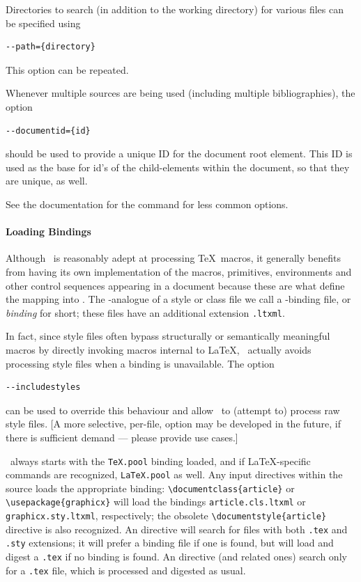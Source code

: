 \documentclass{book}
\begin{document}
Directories to search (in addition to the working directory)
for various files can be specified using
\begin{lstlisting}[style=shell]
--path={directory}
\end{lstlisting}
This option can be repeated.

Whenever multiple sources are being used (including multiple bibliographies),
the option
\begin{lstlisting}[style=shell]
--documentid={id}
\end{lstlisting}
should be used to provide a unique ID for the document root element.
This ID is used as the base for id's of the child-elements within the document,
so that they are unique, as well.

See the documentation for the command  for
less common options.

\paragraph{Loading Bindings}\label{usage.conversion.loading}
Although \LaTeXML\ is reasonably adept at processing \TeX\ macros,
it generally benefits from having its own implementation of
the macros, primitives, environments and other control sequences
appearing in a document because these are what define the mapping into \XML.
The \LaTeXML-analogue of a style or class file we call a
\LaTeXML-binding file, or \emph{binding} for short;
these files have an additional extension \texttt{.ltxml}.

In fact, since style files often bypass structurally or semantically
meaningful macros by directly invoking macros internal to \LaTeX,
\LaTeXML\ actually avoids processing style files when a binding is unavailable.
The option
\begin{lstlisting}[style=shell]
--includestyles
\end{lstlisting}
can be used to override this behaviour and allow \LaTeXML\ to
(attempt to) process raw style files.
[A more selective, per-file, option may be developed in the future,
if there is sufficient demand --- please provide use cases.]

\LaTeXML\ always starts with the \texttt{TeX.pool} binding loaded,
and if \LaTeX-specific commands are recognized, \texttt{LaTeX.pool} as well.
Any input directives within the source loads the appropriate binding:
\verb|\documentclass{article}| or \verb|\usepackage{graphicx}|
will load the bindings \texttt{article.cls.ltxml} or \texttt{graphicx.sty.ltxml},
respectively; the obsolete \verb|\documentstyle{article}|
directive is also recognized.
An \verb|| directive will search for
files with both \texttt{.tex} and \texttt{.sty} extensions;
it will prefer a binding file if one is found,
but will load and digest a \texttt{.tex} if no binding is found.
An \verb|| directive (and related ones) search only for
a \texttt{.tex} file, which is processed and digested as usual.
\end{document}
